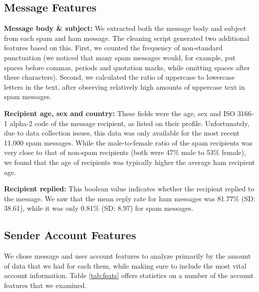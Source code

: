 \documentclass[preprint]{acm_proc_article-sp}
\begin{document}
\subsection{Message Features}

\textbf{Message body \& subject:} We extracted both the message body and subject from 
each spam and ham message. The cleaning script generated two additional features based 
on this. First, we counted the frequency of non-standard punctuation (we noticed that many 
spam messages would, for example, put spaces before commas, periods and quotation marks, 
while omitting spaces after these characters). Second, we calculated the ratio of uppercase to 
lowercase letters in the text, after observing relatively high amounts of uppercase text in 
spam messages.

\textbf{Recipient age, sex and country:} These fields were the age, sex and ISO 3166-1 alpha-2 code of the message 
recipient, as listed on their profile. Unfortunately, due to data collection issues, this data was only available 
for the most recent 11,000 spam messages. While the male-to-female ratio of the spam recipients was very close to that 
of non-spam recipients (both were 47\% male to 53\% female), we found that the age of recipients was typically higher 
the average ham recipient age.

\textbf{Recipient replied:} This boolean value indicates whether the recipient replied to the message. We saw 
that the mean reply rate for ham messages was 81.77\% (SD: 38.61), while it was only 0.81\% (SD: 8.97) for spam messages. 

\subsection{Sender Account Features}

We chose message and user account features to analyze primarily by the amount of data that 
we had for each them, while making sure to include the most vital account information. 
Table \ref{tab:feats} offers statistics on a number of the account features that we examined. 
\end{document}
